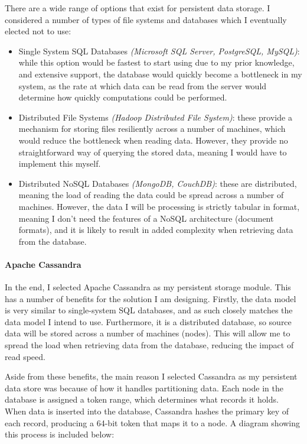 There are a wide range of options that exist for persistent data storage. I considered a number of types of file systems and databases which I eventually elected not to use:
\begin{itemize}
	\item Single System SQL Databases \textit{(Microsoft SQL Server, PostgreSQL, MySQL)}: while this option would be fastest to start using due to my prior knowledge, and extensive support, the database would quickly become a bottleneck in my system, as the rate at which data can be read from the server would determine how quickly computations could be performed.
	\item Distributed File Systems \textit{(Hadoop Distributed File System)}: these provide a mechanism for storing files resiliently across a number of machines, which would reduce the bottleneck when reading data. However, they provide no straightforward way of querying the stored data, meaning I would have to implement this myself.
	\item Distributed NoSQL Databases \textit{(MongoDB, CouchDB)}: these are distributed, meaning the load of reading the data could be spread across a number of machines. However, the data I will be processing is strictly tabular in format, meaning I don't need the features of a NoSQL architecture (document formats), and it is likely to result in added complexity when retrieving data from the database.
\end{itemize}

\paragraph{Apache Cassandra} 
In the end, I selected Apache Cassandra %
as my persistent storage module. This has a number of benefits for the solution I am designing. Firstly, the data model is very similar to single-system SQL databases, and as such closely matches the data model I intend to use. Furthermore, it is a distributed database, so source data will be stored across a number of machines (nodes). This will allow me to spread the load when retrieving data from the database, reducing the impact of read speed. 

Aside from these benefits, the main reason I selected Cassandra as my persistent data store was because of how it handles partitioning data. Each node in the database is assigned a token range, which determines what records it holds. When data is inserted into the database, Cassandra hashes the primary key of each record, producing a 64-bit token that maps it to a node. A diagram showing this process is included below:

